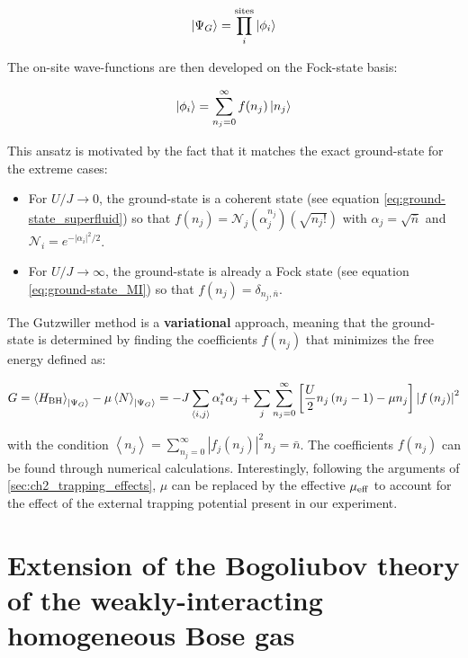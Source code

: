 \begin{equation}
    \ket{\Psi_G} = \prod_i^{\text{sites}} \ket{\phi_i}
\end{equation}

\noindent The on-site wave-functions are then developed on the Fock-state basis:

\begin{equation}
    \ket{\phi_i}= \sum_{n_j=0}^{\infty} f(n_j) \ket{n_j}
\end{equation}

This ansatz is motivated by the fact that it matches the exact ground-state for the extreme cases:

\begin{itemize}
    \item For $U/J \to 0$, the ground-state is a coherent state (see equation \ref{eq:ground-state_superfluid}) so that $f(n_j) = \mathcal{N}_{j}  (\alpha_{j}^{n_{j}})(\sqrt{n_{j} !})$ with $\alpha_j=\sqrt{\bar{n}}$ and $\mathcal{N}_{i}=e^{-\left|\alpha_{i}\right|^{2} / 2}$.
    \item For $U/J \to \infty$, the ground-state is already a Fock state (see equation \ref{eq:ground-state_MI}) so that $f(n_j) = \delta_{n_j,\bar{n}}$.
\end{itemize}

The Gutzwiller method is a \textbf{variational} approach, meaning that the ground-state is determined by finding the coefficients $f(n_j)$ that minimizes the free energy defined as:

\begin{equation}
    G = \left\langle H_{\mathrm{BH}}\right\rangle_{\ket{\Psi_G}} - \mu \left\langle N\right\rangle_{\ket{\Psi_G}} = -J \sum_{\langle i, j\rangle} \alpha_{i}^{*} \alpha_{j}+\sum_{j} \sum_{n_{j}=0}^{\infty}\left[\frac{U}{2} n_{j}\left(n_{j}-1\right)-\mu n_{j}\right]\left|f\left(n_{j}\right)\right|^{2}
\end{equation}

\noindent with the condition $\left\langle n_{j}\right\rangle=\sum_{n_{j}=0}^{\infty}\left|f_{j}\left(n_{j}\right)\right|^{2} n_{j}=\bar{n}$. The coefficients $f(n_j)$ can be found through numerical calculations. Interestingly, following the arguments of \ref{sec:ch2_trapping_effects}, $\mu$ can be replaced by the effective $\mu_{\rm{eff}}$ to account for the effect of the external trapping potential present in our experiment.

\section{Extension of the Bogoliubov theory of the weakly-interacting homogeneous Bose gas}

